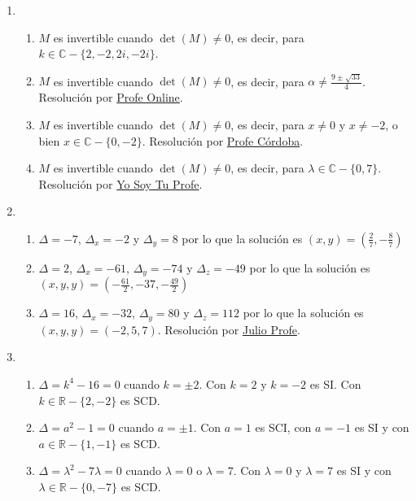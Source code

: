 \documentclass[a4paper]{article}
\newcommand{\exercise}{\item}
\begin{document}
\begin{enumerate}
\begin{enumerate} [label=(\alph*)]
		\item $x=2$ o $x=\frac{8}{3}$. Resolución por \href{https://youtu.be/mjS7OMrtNd8}{Mate Profesor Rosado}
		\item $x=\displaystyle\frac{9\pm\sqrt{33}}{4}$. Resolución por \href{https://youtu.be/nJRWcW-m7UU}{Profe Online}
		\item $\lambda=0$, $\lambda=1$ o $\lambda=2$. Resolución por \href{https://youtu.be/YCZd_BWyE0o}{Matemático Compulsivo}
\end{enumerate}\exercise\begin{enumerate} [label=(\alph*)]		\item $M$ es invertible cuando $\det(M)\neq0$, es decir, para $k\in\mathbb{C}-\{2,-2,2i,-2i\}$.
		\item $M$ es invertible cuando $\det(M)\neq0$, es decir, para $\alpha\neq\displaystyle\frac{9\pm\sqrt{33}}{4}$. Resolución por \href{https://youtu.be/nJRWcW-m7UU}{Profe Online}.
		\item $M$ es invertible cuando $\det(M)\neq0$, es decir, para $x\neq0$ y $x\neq-2$, o bien $x\in\mathbb{C}-\{0,-2\}$. Resolución por \href{https://youtu.be/KAt_M122xGw}{Profe Córdoba}.
		\item $M$ es invertible cuando $\det(M)\neq0$, es decir, para $\lambda\in\mathbb{C}-\{0,7\}$. Resolución por \href{https://youtu.be/Q1HjTmvsAGc}{Yo Soy Tu Profe}.
\end{enumerate}\exercise\begin{enumerate} [label=(\alph*)]		\item $\Delta=-7$, $\Delta_x=-2$ y $\Delta_y=8$ por lo que la solución es $(x,y)=\left(\frac{2}{7},-\frac{8}{7}\right)$
		\item $\Delta=2$, $\Delta_x=-61$, $\Delta_y=-74$ y $\Delta_z=-49$ por lo que la solución es $(x,y,y)=\left(-\frac{61}{2},-37,-\frac{49}{2}\right)$
		\item $\Delta=16$, $\Delta_x=-32$, $\Delta_y=80$ y $\Delta_z=112$ por lo que la solución es $(x,y,y)=(-2,5,7)$. Resolución por \href{https://youtu.be/lLPcHVAqY80}{Julio Profe}.
\end{enumerate}\exercise\begin{enumerate} [label=(\alph*)]		\item $\Delta=k^4-16=0$ cuando $k=\pm 2$. Con $k=2$ y $k=-2$ es SI. Con $k\in\mathbb{R}-\{2,-2\}$ es SCD.
		\item $\Delta=a^2-1=0$ cuando $a=\pm 1$. Con $a=1$ es SCI, con $a=-1$ es SI y con $a\in\mathbb{R}-\{1,-1\}$ es SCD.
		\item $\Delta=\lambda^2-7\lambda=0$ cuando $\lambda=0$ o $\lambda=7$. Con $\lambda=0$ y $\lambda=7$ es SI y con $\lambda\in\mathbb{R}-\{0,-7\}$ es SCD.

\end{enumerate}
\end{enumerate}
\end{document}
